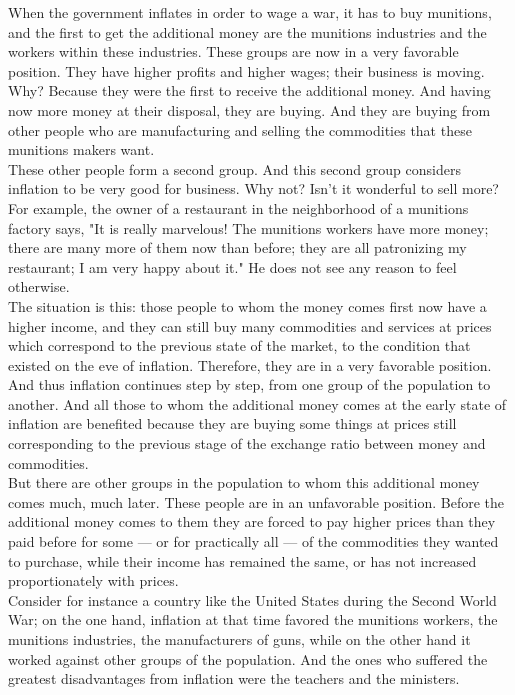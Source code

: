 \documentclass[a4paper]{article}
\begin{document}
When the government inflates in order to wage a war, it has to buy munitions, 
and the first to get the additional money are the munitions industries and the 
workers within these industries. These groups are now in a very favorable 
position. They have higher profits and higher wages; their business is moving. 
Why? Because they were the first to receive the additional money. And having 
now more money at their disposal, they are buying. And they are buying from 
other people who are manufacturing and selling the commodities that these 
munitions makers want.\\

These other people form a second group. And this second group considers 
inflation to be very good for business. Why not? Isn't it wonderful to sell 
more? For example, the owner of a restaurant in the neighborhood of a munitions
factory says, "It is really marvelous! The munitions workers have more money; 
there are many more of them now than before; they are all patronizing my 
restaurant; I am very happy about it." He does not see any reason to feel 
otherwise.\\

The situation is this: those people to whom the money comes first now have a 
higher income, and they can still buy many commodities and services at prices 
which correspond to the previous state of the market, to the condition that 
existed on the eve of inflation. Therefore, they are in a very favorable 
position. And thus inflation continues step by step, from one group of the 
population to another. And all those to whom the additional money comes at the 
early state of inflation are benefited because they are buying some things at 
prices still corresponding to the previous stage of the exchange ratio between 
money and commodities.\\

But there are other groups in the population to whom this additional money 
comes much, much later. These people are in an unfavorable position. Before the
additional money comes to them they are forced to pay higher prices than they 
paid before for some — or for practically all — of the commodities they wanted 
to purchase, while their income has remained the same, or has not increased 
proportionately with prices.\\

Consider for instance a country like the United States during the Second World 
War; on the one hand, inflation at that time favored the munitions workers, the
munitions industries, the manufacturers of guns, while on the other hand it 
worked against other groups of the population. And the ones who suffered the 
greatest disadvantages from inflation were the teachers and the ministers.\\
\end{document}
